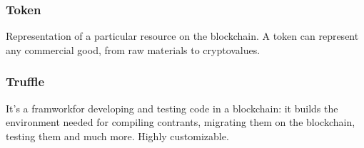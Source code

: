 \subsubsection*{Token}
Representation of a particular resource on the blockchain\glo. A token can represent any commercial good, from raw materials to cryptovalues. 

\subsubsection*{Truffle}
It's a framwork\glosp for developing and testing code in a blockchain\glo: it builds the environment needed for compiling contrants, migrating them on the blockchain, testing them and much more. Highly customizable.





